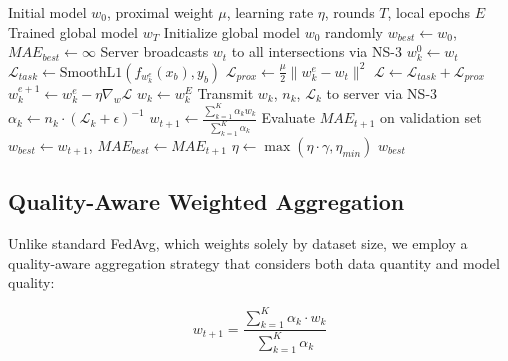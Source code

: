 \documentclass[conference]{IEEEtran}
\begin{document}
\begin{algorithm}[htbp]
\caption{ResilNet-FL Training with FedProx}
\label{alg:fedprox}
\begin{algorithmic}[1]
\REQUIRE Initial model $w_0$, proximal weight $\mu$, learning rate $\eta$, rounds $T$, local epochs $E$
\ENSURE Trained global model $w_T$
\STATE Initialize global model $w_0$ randomly
\STATE $w_{best} \leftarrow w_0$, $MAE_{best} \leftarrow \infty$
    \STATE Server broadcasts $w_t$ to all intersections via NS-3
        \STATE $w_k^0 \leftarrow w_t$ 
                \STATE $\mathcal{L}_{task} \leftarrow \text{SmoothL1}(f_{w_k^e}(x_b), y_b)$
                \STATE $\mathcal{L}_{prox} \leftarrow \frac{\mu}{2}\|w_k^e - w_t\|^2$
                \STATE $\mathcal{L} \leftarrow \mathcal{L}_{task} + \mathcal{L}_{prox}$
                \STATE $w_k^{e+1} \leftarrow w_k^e - \eta \nabla_{w} \mathcal{L}$
            \ENDFOR
        \ENDFOR
        \STATE $w_k \leftarrow w_k^E$
        \STATE Transmit $w_k$, $n_k$, $\mathcal{L}_k$ to server via NS-3
    \ENDFOR
    \STATE {}
        \STATE $\alpha_k \leftarrow n_k \cdot (\mathcal{L}_k + \epsilon)^{-1}$
    \ENDFOR
    \STATE $w_{t+1} \leftarrow \frac{\sum_{k=1}^{K} \alpha_k w_k}{\sum_{k=1}^{K} \alpha_k}$
    \STATE Evaluate $MAE_{t+1}$ on validation set
        \STATE $w_{best} \leftarrow w_{t+1}$, $MAE_{best} \leftarrow MAE_{t+1}$
    \ENDIF
    \STATE $\eta \leftarrow \max(\eta \cdot \gamma, \eta_{min})$ 
\ENDFOR
\RETURN $w_{best}$
\end{algorithmic}
\end{algorithm}

\subsection{Quality-Aware Weighted Aggregation}
Unlike standard FedAvg, which weights solely by dataset size, we employ a quality-aware aggregation strategy that considers both data quantity and model quality:

\begin{equation}
w_{t+1} = \frac{\sum_{k=1}^{K} \alpha_k \cdot w_k}{\sum_{k=1}^{K} \alpha_k}
\end{equation}
\end{document}
